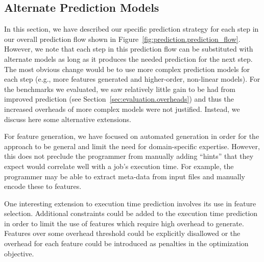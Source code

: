 \subsection{Alternate Prediction Models}

In this section, we have described our specific prediction strategy for each
step in our overall prediction flow shown in
Figure~\ref{fig:prediction.prediction_flow}. However, we note that each step in
this prediction flow can be substituted with alternate models as long as it
produces the needed prediction for the next step.
The most obvious change would be to use more complex prediction models for each
step (e.g., more features generated and higher-order, non-linear models).
For the benchmarks we evaluated, we saw relatively little gain to be had from
improved prediction (see Section~\ref{sec:evaluation.overheads}) and thus the
increased overheads of more complex models were not justified.
Instead, we discuss here some alternative extensions.

For feature generation, we have focused on automated generation in order for
the approach to be general and limit the need for domain-specific expertise.
However, this does not preclude the programmer from manually adding ``hints''
that they expect would correlate well with a job's execution time. For example,
the programmer may be able to extract meta-data from input files and manually
encode these to features.


One interesting extension to execution time prediction involves its use in
feature selection. Additional constraints could be added to the execution
time prediction in order to limit the use of features which require high
overhead to generate. Features over some overhead threshold could
be explicitly disallowed or the overhead for each feature could be
introduced as penalties in the optimization objective.

